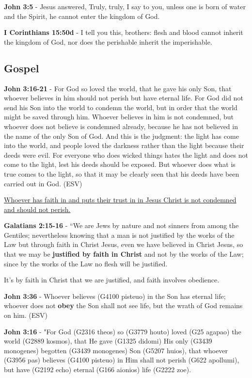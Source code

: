 \documentclass[11pt]{article}
\begin{document}
\textbf{John 3:5} - Jesus answered, Truly, truly, I say to you, unless one is born of water and the Spirit, he cannot enter the kingdom of God.

\textbf{I Corinthians 15:50d} - I tell you this, brothers: flesh and blood cannot inherit the kingdom of God, nor does the perishable inherit the imperishable.

\subsection{Gospel}
\label{sec:orgbb5fd42}
\textbf{John 3:16-21} - For God so loved the world, that he gave his only Son, that whoever believes in him should not perish but have eternal life. For God did not send his Son into the world to condemn the world, but in order that the world might be saved through him. Whoever believes in him is not condemned, but whoever does not believe is condemned already, because he has not believed in the name of the only Son of God. And this is the judgment: the light has come into the world, and people loved the darkness rather than the light because their deeds were evil. For everyone who does wicked things hates the light and does not come to the light, lest his deeds should be exposed. But whoever does what is true comes to the light, so that it may be clearly seen that his deeds have been carried out in God. (ESV)

\uline{Whoever has faith in and puts their trust in in Jesus Christ is not condemned and should not perish.}

\textbf{Galatians 2:15-16} - “We are Jews by nature and not sinners from among the Gentiles; nevertheless knowing that a man is not justified by the works of the Law but through faith in Christ Jesus, even we have believed in Christ Jesus, so that we may be \textbf{justified by faith in Christ} and not by the works of the Law; since by the works of the Law no flesh will be justified.

It's by faith in Christ that we are justified, and faith involves obedience.

\textbf{John 3:36} - Whoever believes (G4100 pisteuo) in the Son has eternal life; whoever does not \textbf{obey} the Son shall not see life, but the wrath of God remains on him. (ESV)

\textbf{John 3:16} - "For God (G2316 theos) so (G3779 houto) loved (G25 agapao) the world (G2889 kosmos), that He gave (G1325 didomi) His only (G3439 monogenes) begotten (G3439 monogenes) Son (G5207 huios), that whoever (G3956 pas) believes (G4100 pisteuo) in Him shall not perish (G622 apollumi), but have (G2192 echo) eternal (G166 aionios) life (G2222 zoe).
\end{document}
